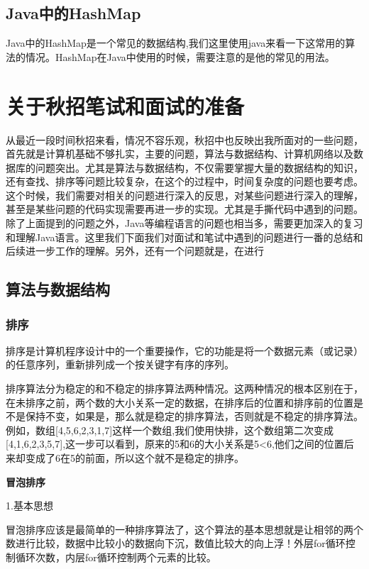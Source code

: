 \documentclass[UTF8]{ctexart}
\begin{document}
\subsection{Java中的HashMap}
Java中的HashMap是一个常见的数据结构,我们这里使用java来看一下这常用的算法的情况。HashMap在Java中使用的时候，需要注意的是他的常见的用法。






\section{关于秋招笔试和面试的准备}
从最近一段时间秋招来看，情况不容乐观，秋招中也反映出我所面对的一些问题，首先就是计算机基础不够扎实，主要的问题，算法与数据结构、计算机网络以及数据库的问题突出。尤其是算法与数据结构，不仅需要掌握大量的数据结构的知识，还有查找、排序等问题比较复杂，在这个的过程中，时间复杂度的问题也要考虑。这个时候，我们需要对相关的问题进行深入的反思，对某些问题进行深入的理解，甚至是某些问题的代码实现需要再进一步的实现。尤其是手撕代码中遇到的问题。除了上面提到的问题之外，Java等编程语言的问题也相当多，需要更加深入的复习和理解Java语言。这里我们下面我们对面试和笔试中遇到的问题进行一番的总结和后续进一步工作的理解。另外，还有一个问题就是，在进行\\
\subsection{算法与数据结构}
\subsubsection{排序}
排序是计算机程序设计中的一个重要操作，它的功能是将一个数据元素（或记录）的任意序列，重新排列成一个按关键字有序的序列。

排序算法分为稳定的和不稳定的排序算法两种情况。这两种情况的根本区别在于，在未排序之前，两个数的大小关系一定的数据，在排序后的位置和排序前的位置是不是保持不变，如果是，那么就是稳定的排序算法，否则就是不稳定的排序算法。例如，数组[4,5,6,2,3,1,7]这样一个数组,我们使用快排，这个数组第二次变成[4,1,6,2,3,5,7],这一步可以看到，原来的5和6的大小关系是5<6,他们之间的位置后来却变成了6在5的前面，所以这个就不是稳定的排序。

\textbf{冒泡排序}

1.基本思想

冒泡排序应该是最简单的一种排序算法了，这个算法的基本思想就是让相邻的两个数进行比较，数据中比较小的数据向下沉，数值比较大的向上浮！外层for循环控制循环次数，内层for循环控制两个元素的比较。
\end{document}
